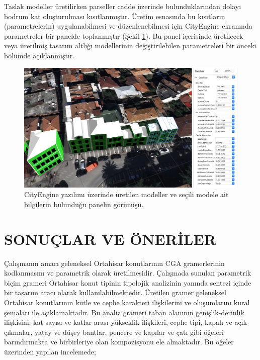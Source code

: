 \documentclass[12pt,turkish,a4paperpaper,]{report}
\begin{document}
Taslak modeller üretilirken parseller cadde üzerinde bulunduklarından
dolayı bodrum kat oluşturulması kısıtlanmıştır. Üretim esnasında bu
kısıtların (parametrelerin) uygulanabilmesi ve düzenlenebilmesi için
CityEngine ekranında parametreler bir panelde toplanmıştır (Şekil
\ref{CGAPanel}). Bu panel içerisinde üretilecek veya üretilmiş tasarım
altlığı modellerinin değiştirilebilen parametreleri bir önceki bölümde
açıklanmıştır.

\begin{figure}
\centering
\includegraphics[width=1\textwidth,height=\textheight]{source/figures/CGAPanel.png}
\caption{CityEngine yazılımı üzerinde üretilen modeller ve seçili modele
ait bilgilerin bulunduğu panelin görünüşü. \label{CGAPanel}}
\end{figure}

\newpage

\hypertarget{sonuuxe7lar-ve-uxf6neriler}{%
\chapter{SONUÇLAR VE ÖNERİLER}\label{sonuuxe7lar-ve-uxf6neriler}}

\thispagestyle{empty}

Çalışmanın amacı geleneksel Ortahisar konutlarının CGA gramerlerinin
kodlanmasını ve parametrik olarak üretilmesidir. Çalışmada sunulan
parametrik biçim grameri Ortahisar konut tipinin tipolojik analizinin
yanında sentezi içinde bir tasarım aracı olarak kullanılabilmektedir.
Üretilen gramer geleneksel Ortahisar konutlarının kütle ve cephe
karakteri ilişkilerini ve oluşumlarını kural şemaları ile
açıklamaktadır. Bu analiz grameri taban alanının genişlik-derinlik
ilişkisini, kat sayısı ve katlar arası yükseklik ilişkileri, cephe tipi,
kapalı ve açık çıkmalar, yatay ve düşey bantlar, pencere ve kapılar ve
çatı gibi öğeleri barındırmakta ve birbirleriye olan kompozisyonu ele
almaktadır. Bu öğeler üzerinden yapılan incelemede;
\end{document}
